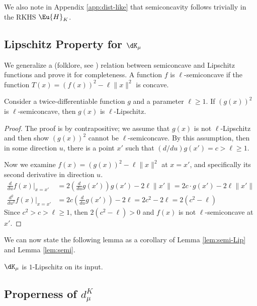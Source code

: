 \documentclass[11pt]{myclass}
\begin{document}
We also note in Appendix \ref{app:dist-like} that semiconcavity follows trivially in the RKHS $\Eu{H}_K$.  

\subsection{Lipschitz Property for $\dK_\mu$}
\label{sec:lipschitz}

We generalize a (folklore, see \cite{ChazalCohen-SteinerMerigot2011}) relation between semiconcave and Lipschitz functions and prove it for completeness.  
A function $f$ is $\ell$-semiconcave if the function $T(x) = (f(x))^2 - \ell \|x\|^2$ is concave.  

\begin{lemma}
Consider a twice-differentiable function $g$ and a parameter $\ell \geq 1$.  
If $(g(x))^2$ is $\ell$-semiconcave, then $g(x)$ is $\ell$-Lipschitz.  
\label{lem:semi-Lip}
\end{lemma}
\begin{proof}
The proof is by contrapositive; we assume that $g(x)$ is not $\ell$-Lipschitz and then show $(g(x))^2$ cannot be $\ell$-semiconcave.  
By this assumption, then in some direction $u$, there is a point $x'$ such that $(d/du) g(x') = c > \ell \geq 1$.  

Now we examine $f(x) = (g(x))^2 - \ell \|x\|^2$ at $x = x'$, and specifically its second derivative in direction $u$. 
\begin{align*}
\frac{d}{du} f(x) \big|_{x=x'} &= 2 \left(\frac{d}{du} g(x')\right) g(x') - 2 \ell \|x'\| = 2 c \cdot g(x') - 2 \ell \|x'\|
\\
\frac{d^2}{du^2} f(x) \big|_{x=x'} &= 2 c \left(\frac{d}{du} g(x')\right) - 2 \ell = 2c^2 - 2 \ell = 2 (c^2 - \ell)
\end{align*}
Since $c^2 > c > \ell \geq 1$, then $2 (c^2 - \ell) > 0$ and $f(x)$ is not $\ell$-semiconcave at $x'$.  
\end{proof}

We can now state the following lemma as a corollary of Lemma \ref{lem:semi-Lip} and Lemma \ref{lem:semi}.  

\begin{lemma}[D1]
$\dK_\mu$ is $1$-Lipschitz on its input. 
\label{lem:Lipschitz}
\end{lemma}


\subsection{Properness of $d^K_{\mu}$}
\end{document}
